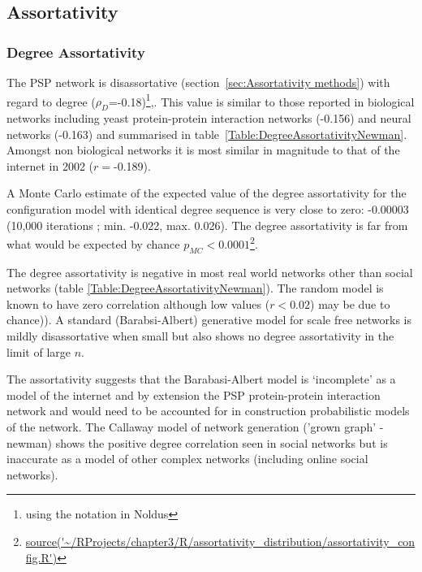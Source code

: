 \clearpage

\subsection{ Assortativity }
\subsubsection{Degree Assortativity}


 The PSP network is disassortative (section~\ref{sec:Assortativity methods}) with regard to degree ($\rho_D$=-0.18)\footnote{using the notation in Noldus\cite{noldus2015assortativity}},. 
 This value  %
 is similar to those reported in biological networks including yeast protein-protein interaction networks (-0.156) and neural networks (-0.163) \cite{newman2002assortative}  and summarised in table~\ref{Table:DegreeAssortativityNewman}. Amongst non biological networks it is most similar in magnitude to that of the internet in 2002\cite{newman2002assortative} ($r=$-0.189). 

 A Monte Carlo estimate of the expected value of the degree assortativity for the configuration model with identical degree sequence is very close to zero: -0.00003 (10,000 iterations ; min. -0.022, max.  0.026). The degree assortativity is far from what would be expected by chance  $p_{MC}<0.0001$\footnote{\url{source('~/RProjects/chapter3/R/assortativity_distribution/assortativity_config.R')}}.

The degree assortativity is negative in most real world networks other than social networks (table \ref{Table:DegreeAssortativityNewman})\cite{newman2002assortative}. The random model is known to have zero correlation although low values ($r<0.02$) may be due to chance)\cite{noldus2015assortativity}). A standard (Barabsi-Albert) generative model for scale free networks is  mildly disassortative\cite{noldus2015assortativity} when small but also shows no degree assortativity in the limit of large $n$\cite{noldus2015assortativity}. 

The assortativity suggests that the Barabasi-Albert model is `incomplete' as a model of the internet \cite{newman2002assortative} and by extension the PSP protein-protein interaction network and would need to be accounted for in construction probabilistic models of the network. 
The Callaway model of network generation ('grown graph' - newman) shows the positive degree correlation seen in social networks but is inaccurate as a model of other complex networks (including online social networks). 



